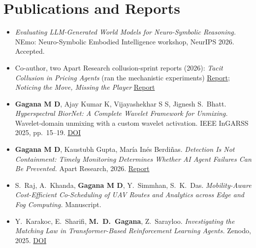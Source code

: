 \documentclass[10pt,a4paper]{article}
\newcommand{\link}[2]{\href{#1}{\color{accent}#2}}
\begin{document}
\section{Publications and Reports}
\begin{itemize}[label={}, leftmargin=0pt]
  \item \textit{Evaluating LLM-Generated World Models for Neuro-Symbolic Reasoning.} NEmo: Neuro-Symbolic Embodied Intelligence workshop, NeurIPS 2026. Accepted.
  \item Co-author, two Apart Research collusion-sprint reports (2026): \textit{Tacit Collusion in Pricing Agents} (ran the mechanistic experiments) \link{https://apartresearch.com/sprints/projects/tacit-collusion-in-pricing-agents-robustness-detection-and-a-mechanistic-probe-of-a-pricing-llm-qxsb}{Report}; \textit{Noticing the Move, Missing the Player} \link{https://apartresearch.com/sprints/projects/noticing-the-move-missing-the-player-llm-agents-detect-behavioral-shifts-but-not-peer-swaps-uf7r}{Report}
  \item \textbf{Gagana M D}, Ajay Kumar K, Vijayashekhar S S, Jignesh S.\ Bhatt.
        \textit{Hyperspectral BiorNet: A Complete Wavelet Framework for Unmixing.} Wavelet-domain unmixing with a custom wavelet activation.
        IEEE InGARSS 2025, pp.\ 15--19. \link{https://doi.org/10.1109/InGARSS67683.2025.11584022}{DOI}
  \item \textbf{Gagana M D}, Kaustubh Gupta, Mar\'ia In\'es Berdi\~nas.
        \textit{Detection Is Not Containment: Timely Monitoring Determines Whether AI Agent Failures Can Be Prevented.}
        Apart Research, 2026. \link{https://apartresearch.com/sprints/projects/detection-is-not-containment-timely-monitoring-determines-whether-ai-agent-failures-can-be-prevented-oexs}{Report}
  \item S.\ Raj, A.\ Khanda, \textbf{Gagana M D}, Y.\ Simmhan, S.\ K.\ Das.
        \textit{Mobility-Aware Cost-Efficient Co-Scheduling of UAV Routes and Analytics across Edge and Fog Computing.} Manuscript.
  \item Y.\ Karakoc, E.\ Sharifi, \textbf{M.\ D.\ Gagana}, Z.\ Sarayloo.
        \textit{Investigating the Matching Law in Transformer-Based Reinforcement Learning Agents.}
        Zenodo, 2025. \link{https://doi.org/10.5281/zenodo.15462678}{DOI}
\end{itemize}

\end{document}

